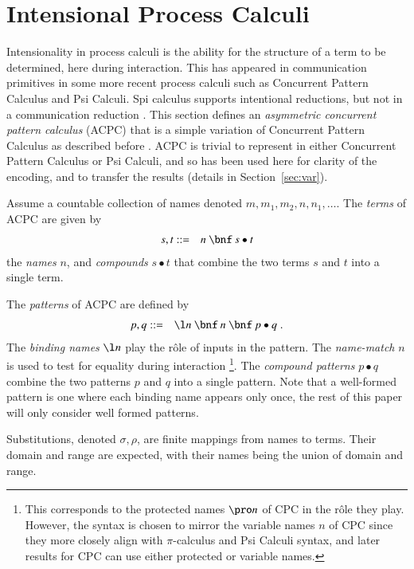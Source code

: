 \documentclass[submission,copyright,creativecommons]{eptcs}
\begin{document}
\section{Intensional Process Calculi}
\label{sec:int}

Intensionality in process calculi is the ability for the structure of a term to be
determined, here during interaction.
This has appeared in communication primitives in some more recent process calculi such
as Concurrent Pattern Calculus and Psi Calculi.
Spi calculus supports intentional reductions, but not in a communication reduction
\cite{Abadi:1997:CCP:266420.266432}.
This section defines an {\em asymmetric concurrent pattern calculus} (ACPC) that
is a simple variation of Concurrent Pattern Calculus as described before \cite{GivenWilsonPhD}.
ACPC is trivial to represent in either Concurrent Pattern Calculus or Psi Calculi,
and so has been used here for clarity of the encoding, and to transfer the results
(details in Section~\ref{sec:var}).

Assume a countable collection of names denoted $m,m_1,m_2,n,n_1,\ldots$.
The {\em terms} of ACPC are given by
\begin{eqnarray*}
s,t &::=& n\ \bnf\ s\bullet t
\end{eqnarray*}
the {\em names} $n$, and {\em compounds} $s\bullet t$ that combine the two terms $s$ and $t$
into a single term.

The {\em patterns} of ACPC are defined by
\begin{eqnarray*}
p,q &::=& \l n\ \bnf\ n\ \bnf\ p\bullet q\; .
\end{eqnarray*}
The {\em binding names} $\l n$ play the r\^ole of inputs in the pattern.
The {\em name-match} $n$ is used to test for equality during interaction
\footnote{This corresponds to the protected names $\pro n$ of CPC in the
r\^ole they play. However, the syntax is chosen to mirror the variable names
$n$ of CPC since they more closely align with $\pi$-calculus and Psi Calculi syntax, and
later results for CPC can use either protected or variable names.}.
The {\em compound patterns} $p\bullet q$ combine the two patterns $p$ and $q$ into a single pattern.
Note that a well-formed pattern is one where each binding name appears only once, the
rest of this paper will only consider well formed patterns.

Substitutions, denoted $\sigma,\rho$, are finite mappings from names to terms.
Their domain and range are expected, with their names being the union of domain and range.
\end{document}
